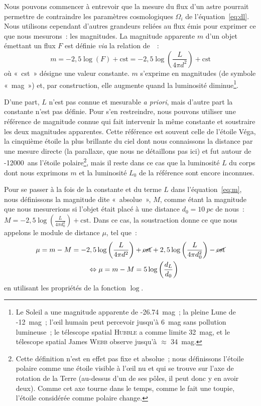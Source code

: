 \documentclass[../main/main.tex]{subfiles}
\begin{document}
Nous pouvons commencer à entrevoir que la mesure du flux d'un astre pourrait
permettre de contraindre les paramètres cosmologiques $\Omega_i$ de
l'équation~\ref{eq:dl}. Nous utilisons cependant d'autres grandeurs reliées au
flux émis pour exprimer ce que nous mesurons~: les magnitudes. La magnitude
apparente $m$ d'un objet émettant un flux $F$ est définie \textit{via} la
relation de~\cite{pogson1856}~:
\begin{equation}\label{eq:m}
    m = -2,5\log \left(F\right) + \text{cst} =
    -2,5\log \left( \frac{L}{4\pi d^2} \right) + \text{cst}
\end{equation}
où «~cst~» désigne une valeur constante. $m$ s'exprime en magnitudes (de
symbole «~mag~») et, par construction, elle augmente quand la luminosité
diminue\footnote{Le Soleil a une magnitude apparente de -\SI{26.74}{mag}~; la
    pleine Lune de -\SI{12}{mag}~; l'œil humain peut percevoir jusqu'à
    \SI{6}{mag} sans pollution lumineuse~; le télescope spatial \textsc{Hubble}
a comme limite \SI{32}{mag}, et le télescope spatial James \textsc{Webb} observe
jusqu'à $\approx$ \SI{34}{mag}.}.

D'une part, $L$ n'est pas connue et mesurable \textit{a priori}, mais d'autre
part la constante n'est pas définie. Pour s'en restreindre, nous pouvons
utiliser une référence de magnitude connue qui fait intervenir la même constante
et soustraire les deux magnitudes apparentes. Cette référence est souvent celle
de l'étoile Véga, la cinquième étoile la plus brillante du ciel dont nous
connaissons la distance par une mesure directe (la parallaxe, que nous ne
détaillons pas ici) et fut autour de -\SI{12000}{ans} l'étoile
polaire\footnote{Cette définition n'est en effet pas fixe et absolue~; nous
    définissons l'étoile polaire comme une étoile visible à l'œil nu et qui se
    trouve sur l'axe de rotation de la Terre (au-dessus d'un de ses pôles, il
    peut donc y en avoir deux). Comme cet axe tourne dans le temps, comme le
fait une toupie, l'étoile considérée comme polaire change.}, mais il reste
dans ce cas que la luminosité $L$ du corps dont nous exprimons $m$ et la
luminosité $L_0$ de la référence sont encore inconnues.

Pour se passer à la fois de la constante et du terme $L$ dans
l'équation~\ref{eq:m}, nous définissons la magnitude dite «~absolue~», $M$,
comme étant la magnitude que nous mesurerions si l'objet était placé à une
distance $d_0 = \SI{10}{pc}$ de nous~: $M = -2,5\log \left( \frac{L}{4\pi d_0^2}
\right) + \text{cst}$. Dans ce cas, la soustraction donne ce que nous appelons
le module de distance $\mu$, tel que~:
\begin{align}\label{eq:mucosmo}
    \mu = m - M = -2,5\log \left( \frac{L}{4\pi d^2} \right) & +
    \cancel{\text{cst}} + 2,5\log \left( \frac{L}{4\pi d_0^2} \right) -
    \cancel{\text{cst}}\nonumber\\
    \Leftrightarrow
    \mu = m-M & = 5\log \left( \frac{d_L}{d_0} \right)
\end{align}
en utilisant les propriétés de la fonction $\log$.
\end{document}
